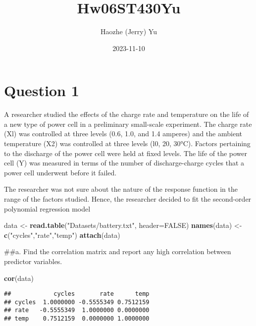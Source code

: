 \documentclass[
]{article}
\title{Hw06ST430Yu}
\author{Haozhe (Jerry) Yu}
\date{2023-11-10}
\newenvironment{Shaded}{\begin{snugshade}}{\end{snugshade}}
\newcommand{\AttributeTok}[1]{\textcolor[rgb]{0.13,0.29,0.53}{#1}}
\newcommand{\ConstantTok}[1]{\textcolor[rgb]{0.56,0.35,0.01}{#1}}
\newcommand{\FunctionTok}[1]{\textcolor[rgb]{0.13,0.29,0.53}{\textbf{#1}}}
\newcommand{\NormalTok}[1]{#1}
\newcommand{\OtherTok}[1]{\textcolor[rgb]{0.56,0.35,0.01}{#1}}
\newcommand{\StringTok}[1]{\textcolor[rgb]{0.31,0.60,0.02}{#1}}
\begin{document}
\maketitle

\hypertarget{question-1}{%
\section{Question 1}\label{question-1}}

A researcher studied the effects of the charge rate and temperature on
the life of a new type of power cell in a preliminary small-scale
experiment. The charge rate (Xl) was controlled at three levels (0.6,
1.0, and 1.4 amperes) and the ambient temperature (X2) was controlled at
three levels (l0, 20, 30°C). Factors pertaining to the discharge of the
power cell were held at fixed levels. The life of the power cell (Y) was
measured in terms of the number of discharge-charge cycles that a power
cell underwent before it failed.

The researcher was not sure about the nature of the response function in
the range of the factors studied. Hence, the researcher decided to fit
the second-order polynomial regression model

\begin{Shaded}
\begin{Highlighting}[]
\NormalTok{data }\OtherTok{\textless{}{-}} \FunctionTok{read.table}\NormalTok{(}\StringTok{"Datasets/battery.txt"}\NormalTok{, }\AttributeTok{header=}\ConstantTok{FALSE}\NormalTok{)}
\FunctionTok{names}\NormalTok{(data) }\OtherTok{\textless{}{-}} \FunctionTok{c}\NormalTok{(}\StringTok{"cycles"}\NormalTok{,}\StringTok{"rate"}\NormalTok{,}\StringTok{"temp"}\NormalTok{)}
\FunctionTok{attach}\NormalTok{(data)}
\end{Highlighting}
\end{Shaded}

\#\#a. Find the correlation matrix and report any high correlation
between predictor variables.

\begin{Shaded}
\begin{Highlighting}[]
\FunctionTok{cor}\NormalTok{(data)}
\end{Highlighting}
\end{Shaded}

\begin{verbatim}
##            cycles       rate      temp
## cycles  1.0000000 -0.5555349 0.7512159
## rate   -0.5555349  1.0000000 0.0000000
## temp    0.7512159  0.0000000 1.0000000
\end{verbatim}
\end{document}
